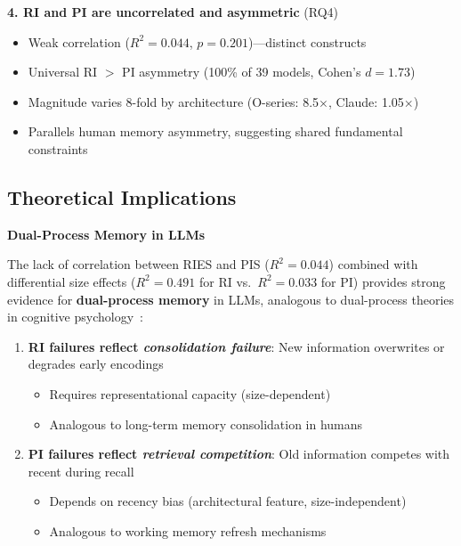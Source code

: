 \documentclass{article}
\begin{document}
\textbf{4. RI and PI are uncorrelated and asymmetric} (RQ4)
\begin{itemize}[itemsep=2pt,topsep=3pt,parsep=0pt]
    \item Weak correlation ($R^2 = 0.044$, $p = 0.201$)---distinct constructs
    \item Universal RI $>$ PI asymmetry (100\% of 39 models, Cohen's $d = 1.73$)
    \item Magnitude varies 8-fold by architecture (O-series: 8.5$\times$, Claude: 1.05$\times$)
    \item Parallels human memory asymmetry, suggesting shared fundamental constraints
\end{itemize}

\subsection{Theoretical Implications}

\textbf{Dual-Process Memory in LLMs}

The lack of correlation between RIES and PIS ($R^2 = 0.044$) combined with differential size effects ($R^2 = 0.491$ for RI vs.\ $R^2 = 0.033$ for PI) provides strong evidence for \textbf{dual-process memory} in LLMs, analogous to dual-process theories in cognitive psychology~\citep{baddeley1974working}:

\begin{enumerate}
    \item \textbf{RI failures reflect \textit{consolidation failure}}: New information overwrites or degrades early encodings
    \begin{itemize}[itemsep=2pt,topsep=3pt,parsep=0pt]
        \item Requires representational capacity (size-dependent)
        \item Analogous to long-term memory consolidation in humans
    \end{itemize}

    \item \textbf{PI failures reflect \textit{retrieval competition}}: Old information competes with recent during recall
    \begin{itemize}[itemsep=2pt,topsep=3pt,parsep=0pt]
        \item Depends on recency bias (architectural feature, size-independent)
        \item Analogous to working memory refresh mechanisms
    \end{itemize}
\end{enumerate}
\end{document}
